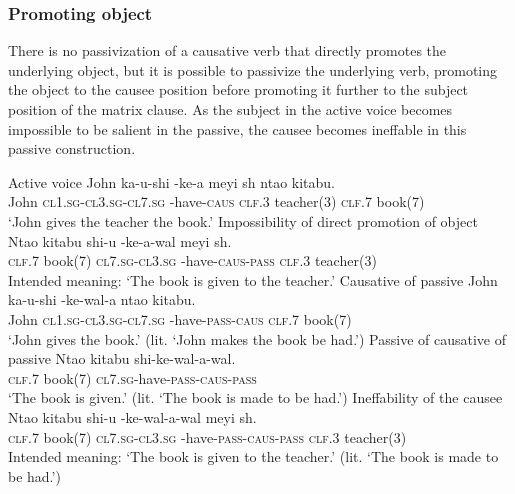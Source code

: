 \subsubsection{Promoting object}

There is no passivization of a causative verb that directly promotes the underlying object, but it is possible to passivize the underlying verb, promoting the object to the causee position before promoting it further to the subject position of the matrix clause. As the subject in the active voice becomes impossible to be salient in the passive, the causee becomes ineffable in this passive construction.

\begin{exe}
\ex
\begin{xlist}
\ex Active voice
\gll John ka-u-shi -ke-\textbeltl a meyi {sh\textramshorns} nta\textbeltl o kitabu. \\
John \textsc{cl1.sg}-\textsc{cl3.sg}-\textsc{cl7.sg} -have-\textsc{caus} \textsc{clf.3} teacher(3) \textsc{clf.7} book(7) \\
\trans `John gives the teacher the book.'
\ex Impossibility of direct promotion of object
\gll * Nta\textbeltl o kitabu shi-u {-ke-\textbeltl a-wal\textramshorns} meyi sh\textramshorns. \\
{} \textsc{clf.7} book(7) \textsc{cl7.sg}-\textsc{cl3.sg} -have-\textsc{caus}-\textsc{pass} \textsc{clf.3} teacher(3) \\
\trans Intended meaning: `The book is given to the teacher.'
\ex Causative of passive
\gll John ka-u-shi -ke-wal\textramshorns-\textbeltl a nta\textbeltl o kitabu. \\
John \textsc{cl1.sg}-\textsc{cl3.sg}-\textsc{cl7.sg} -have-\textsc{pass}-\textsc{caus} \textsc{clf.7} book(7) \\
\trans `John gives the book.' (lit. `John makes the book be had.')
\ex Passive of causative of passive
\gll Nta\textbeltl o kitabu shi-ke-wal\textramshorns-\textbeltl a-wal\textramshorns. \\
\textsc{clf.7} book(7) \textsc{cl7.sg}-have-\textsc{pass}-\textsc{caus}-\textsc{pass} \\
\trans `The book is given.' (lit. `The book is made to be had.')
\ex Ineffability of the causee
\gll * Nta\textbeltl o kitabu shi-u {-ke-wal\textramshorns-\textbeltl a-wal\textramshorns} meyi sh\textramshorns. \\
{} \textsc{clf.7} book(7) \textsc{cl7.sg}-\textsc{cl3.sg} -have-\textsc{pass}-\textsc{caus}-\textsc{pass} \textsc{clf.3} teacher(3) \\
\trans Intended meaning: `The book is given to the teacher.' (lit. `The book is made to be had.')
\end{xlist}
\end{exe}


